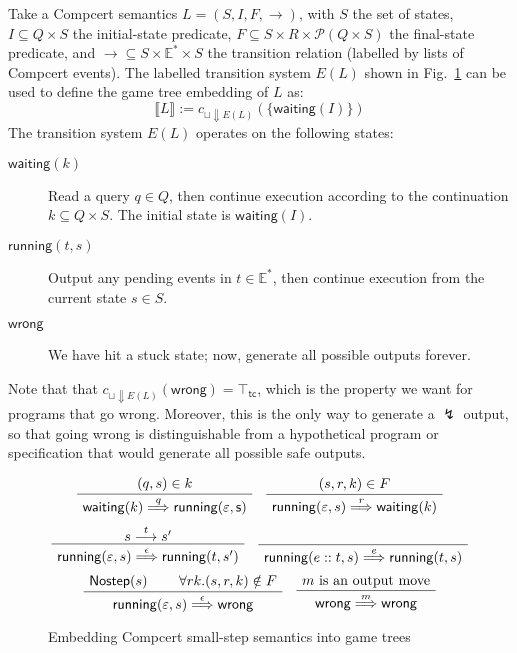 \documentclass[11pt]{article}
\newcommand{\kw}[1]{{\mathsf{#1}}}
\begin{document}
Take a Compcert semantics $L = (S, I, F, \rightarrow)$,
with $S$ the set of states,
$I \subseteq Q \times S$
the initial-state predicate,
$F \subseteq S \times R \times \mathcal{P}(Q \times S)$
the final-state predicate, and
${\rightarrow} \subseteq S \times \mathbb{E}^* \times S$
the transition relation (labelled by lists of Compcert events).
The labelled transition system $E(L)$ shown in Fig.~\ref{fig:embed}
can be used to define the game tree embedding of $L$ as:
\[ \llbracket L \rrbracket := c_{\sqcup \Downarrow E(L)}(\{ \kw{waiting}(I) \}) \]
The transition system $E(L)$ operates on the following states:
\begin{description}
\item[$\kw{waiting}(k)$]
  Read a query $q \in Q$,
  then continue execution according to the continuation
  $k \subseteq Q \times S$.
  The initial state is $\kw{waiting}(I)$.
\item[$\kw{running}(t, s)$]
  Output any pending events in $t \in \mathbb{E}^*$,
  then continue execution from the current state $s \in S$.
\item[$\kw{wrong}$]
  We have hit a stuck state;
  now, generate all possible outputs forever.
\end{description}
Note that that $c_{\sqcup \Downarrow E(L)}(\kw{wrong}) = \top_\kw{tc}$,
which is the property we want for programs that go wrong.
Moreover, this is the only way to generate a $\lightning$ output,
so that going wrong is distinguishable from
a hypothetical program or specification that would
generate all possible safe outputs.

\begin{figure}
\[
  \AxiomC{$(q, s) \in k$}
  \UnaryInfC{$\kw{waiting}(k) \stackrel{q}{\Longrightarrow} \kw{running(\varepsilon, s)}$}
  \DisplayProof
  \quad
  \AxiomC{$(s, r, k) \in F$}
  \UnaryInfC{$\kw{running}(\varepsilon, s) \stackrel{r}{\Longrightarrow} \kw{waiting}(k)$}
  \DisplayProof
\]
\vspace{.33em}
\[
  \AxiomC{$s \stackrel{t}{\longrightarrow} s'$}
  \UnaryInfC{$\kw{running}(\varepsilon, s) \stackrel{\epsilon}{\Longrightarrow} \kw{running}(t, s')$}
  \DisplayProof
  \quad
  \AxiomC{\rule[-.3\baselineskip]{0pt}{\baselineskip}}
  \UnaryInfC{$\kw{running}(e::t, s) \stackrel{e}{\Longrightarrow} \kw{running}(t, s)$}
  \DisplayProof
\]
\vspace{.5em}
\[
  \AxiomC{$\kw{Nostep}(s)$}
  \AxiomC{$\forall r k . (s, r, k) \notin F$}
  \BinaryInfC{$\kw{running}(\varepsilon, s) \stackrel{\epsilon}{\Longrightarrow} \kw{wrong}$}
  \DisplayProof
  \quad
  \AxiomC{$m \mbox{ is an output move}$}
  \UnaryInfC{$\kw{wrong} \stackrel{m}{\Longrightarrow} \kw{wrong}$}
  \DisplayProof
\]
\caption{Embedding Compcert small-step semantics into game trees}
\label{fig:embed}
\end{figure}
\end{document}
